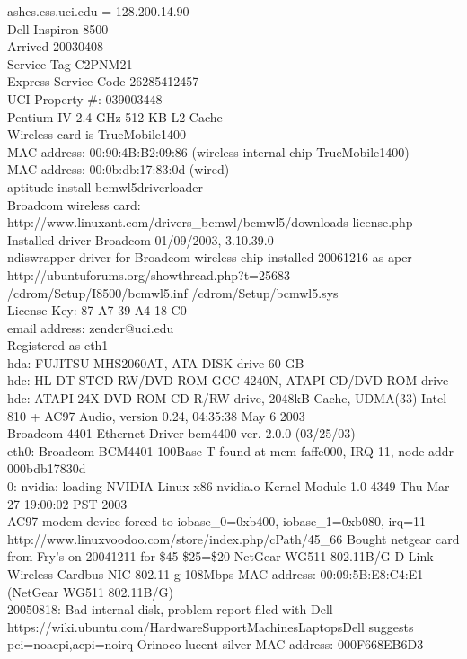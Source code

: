 \documentclass[12pt,twoside]{article}
\begin{document}
ashes.ess.uci.edu = 128.200.14.90 \\
Dell Inspiron 8500 \\
Arrived 20030408 \\
Service Tag C2PNM21 \\
Express Service Code 26285412457 \\
UCI Property \#: 039003448 \\
Pentium IV 2.4 GHz 512 KB L2 Cache\\
Wireless card is TrueMobile1400\\
MAC address: 00:90:4B:B2:09:86 (wireless internal chip TrueMobile1400) \\
MAC address: 00:0b:db:17:83:0d (wired) \\
aptitude install bcmwl5driverloader \\
Broadcom wireless card: http://www.linuxant.com/drivers\_bcmwl/bcmwl5/downloads-license.php \\
Installed driver Broadcom 01/09/2003, 3.10.39.0 \\
ndiswrapper driver for Broadcom wireless chip installed 20061216 as aper
http://ubuntuforums.org/showthread.php?t=25683
/cdrom/Setup/I8500/bcmwl5.inf /cdrom/Setup/bcmwl5.sys \\
License Key:  87-A7-39-A4-18-C0 \\
email address: zender@uci.edu \\
Registered as eth1 \\
hda: FUJITSU MHS2060AT, ATA DISK drive 60 GB\\
hdc: HL-DT-STCD-RW/DVD-ROM GCC-4240N, ATAPI CD/DVD-ROM drive\\
hdc: ATAPI 24X DVD-ROM CD-R/RW drive, 2048kB Cache, UDMA(33)
Intel 810 + AC97 Audio, version 0.24, 04:35:38 May  6 2003\\
Broadcom 4401 Ethernet Driver bcm4400 ver. 2.0.0 (03/25/03)\\
eth0: Broadcom BCM4401 100Base-T found at mem faffe000, IRQ 11, node addr 000bdb17830d\\
0: nvidia: loading NVIDIA Linux x86 nvidia.o Kernel Module  1.0-4349  Thu Mar 27 19:00:02 PST 2003\\
AC97 modem device forced to iobase\_0=0xb400, iobase\_1=0xb080, irq=11\\
http://www.linuxvoodoo.com/store/index.php/cPath/45\_66
Bought netgear card from Fry's on 20041211 for \$45-\$25=\$20
NetGear WG511 802.11B/G
D-Link Wireless Cardbus NIC 802.11 g 108Mbps
MAC address: 00:09:5B:E8:C4:E1 (NetGear WG511 802.11B/G) \\
20050818: Bad internal disk, problem report filed with Dell
https://wiki.ubuntu.com/HardwareSupportMachinesLaptopsDell suggests pci=noacpi,acpi=noirq
Orinoco lucent silver MAC address: 000F668EB6D3
\end{document}
